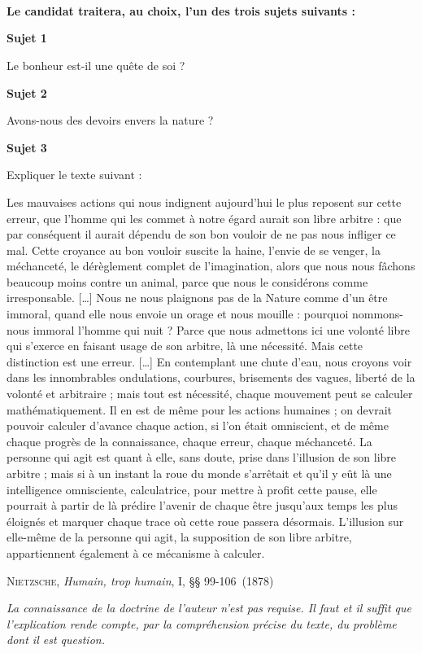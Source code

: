 \documentclass[12pt]{article}
\title{\titre\\
\\[0.5em]
\normalsize{\nomEnseignant}\\
\small{\classes}}
\date{}
\newcommand{\sujetA}{Le bonheur est-il une quête de soi ?}
\newcommand{\sujetB}{Avons-nous des devoirs envers la nature ?}
\newcommand{\sujetC}{Les mauvaises actions qui nous indignent aujourd’hui le plus reposent sur cette erreur, que l’homme qui les commet à notre égard aurait son libre arbitre : que par conséquent il aurait dépendu de son bon vouloir de ne pas nous infliger ce mal. Cette croyance au bon vouloir suscite la haine, l’envie de se venger, la méchanceté, le dérèglement complet de l’imagination, alors que nous nous fâchons beaucoup moins contre un animal, parce que nous le considérons comme irresponsable. […] Nous ne nous plaignons pas de la Nature comme d’un être immoral, quand elle nous envoie un orage et nous mouille : pourquoi nommons-nous immoral l’homme qui nuit ? Parce que nous admettons ici une volonté libre qui s’exerce en faisant usage de son arbitre, là une nécessité. Mais cette distinction est une erreur. […] En contemplant une chute d’eau, nous croyons voir dans les innombrables ondulations, courbures, brisements des vagues, liberté de la volonté et arbitraire ; mais tout est nécessité, chaque mouvement peut se calculer mathématiquement. Il en est de même pour les actions humaines ; on devrait pouvoir calculer d’avance chaque action, si l’on était omniscient, et de même chaque progrès de la connaissance, chaque erreur, chaque méchanceté. La personne qui agit est quant à elle, sans doute, prise dans l’illusion de son libre arbitre ; mais si à un instant la roue du monde s’arrêtait et qu’il y eût là une intelligence omnisciente, calculatrice, pour mettre à profit cette pause, elle pourrait à partir de là prédire l’avenir de chaque être jusqu’aux temps les plus éloignés et marquer chaque trace où cette roue passera désormais. L’illusion sur elle-même de la personne qui agit, la supposition de son libre arbitre, appartiennent également à ce mécanisme à calculer.}
\newcommand{\auteur}{Nietzsche}
\newcommand{\titreLivre}{Humain, trop humain}
\newcommand{\precisionsReference}{, I, §§ 99-106}
\newcommand{\dateReference}{1878}
\begin{document}
\maketitle
\vspace{-1.3cm}

\begin{center}
\textbf{Le candidat traitera, au choix, l’un des trois sujets suivants :}
\end{center}
\vspace{0.3cm}

\bigskip \noindent \textbf{Sujet 1}

\indent
\sujetA

\bigskip \noindent \textbf{Sujet 2}

\indent
\sujetB

\bigskip \noindent \textbf{Sujet 3}

\indent 
Expliquer le texte suivant :

\leftskip=1.1cm
\medskip \noindent
\begin{linenumbers}
\sujetC
\end{linenumbers}

\begin{flushright}
\textsc{\auteur}, \textit{\titreLivre}\precisionsReference (\dateReference)
\end{flushright}

\leftskip=0cm
\vspace{0.8cm} \noindent
\textit{La connaissance de la doctrine de l’auteur n’est pas requise. Il faut et il suffit que
l’explication rende compte, par la compréhension précise du texte, du problème dont
il est question.}
\end{document}

